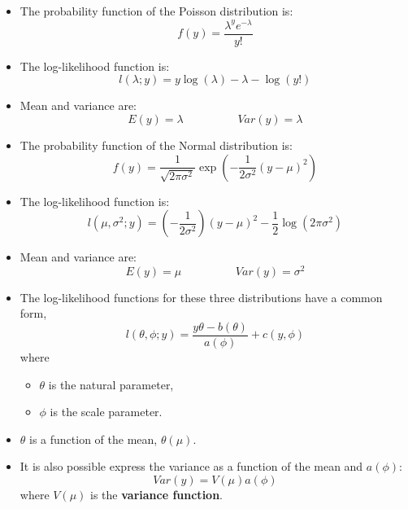 
\begin{frame}
  \begin{itemize}
    \item The probability function of the Poisson distribution is:
      $$ f(y) = \frac{\lambda^y e^{-\lambda}}{y!} $$
    \vspace{0.1cm}
    \item The log-likelihood function is:
      $$ l(\lambda; y) = y \log(\lambda) - \lambda - \log(y!) $$
    \vspace{0.1cm}
    \item Mean and variance  are:
      $$ E(y) = \lambda \hspace{2cm} Var(y) = \lambda $$
  \end{itemize}
\end{frame}




\begin{frame}
  \begin{itemize}
    \item The probability function of the Normal distribution is:
      $$ f(y) = \frac{1}{\sqrt{2\pi\sigma^2}} \exp{\left(-\frac{1}{2\sigma^2}(y-\mu)^2\right)} $$
    \vspace{0.1cm}
    \item The log-likelihood function is:
      $$ l(\mu, \sigma^2; y) = \left(-\frac{1}{2\sigma^2}\right) (y-\mu)^2 - \frac{1}{2} \log(2\pi\sigma^2) $$
    \vspace{0.1cm}
    \item Mean and variance  are:
      $$ E(y) = \mu \hspace{2cm} Var(y) = \sigma^2 $$
  \end{itemize}
\end{frame}




\begin{frame}
  \begin{itemize}
    \item The log-likelihood functions for these three distributions have a common form,
      $$ l(\theta, \phi; y) = \frac{y\theta - b(\theta)}{a(\phi)} + c(y, \phi) $$
      where
      \begin{itemize}
        \item $ \theta $ is the natural parameter,
        \item $ \phi $ is the scale parameter.
      \end{itemize}
    \vspace{0.2cm}
    \item $ \theta $ is a function of the mean, $ \theta(\mu) $. 
    \vspace{0.2cm}
    \item It is also possible express the variance as a function of the mean and $ a(\phi) $:
      $$ Var(y) = V(\mu)a(\phi) $$
      where $ V(\mu) $ is the \textbf{variance function}.
  \end{itemize}
\end{frame}

